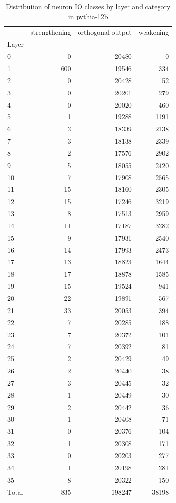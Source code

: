 \begin{table}
\caption{Distribution of neuron IO classes by layer and category in pythia-12b}
\label{tab:pythia-12b}
\begin{tabular}{lrrr}
 & strengthening & orthogonal output & weakening \\
Layer &  &  &  \\
0 & 0 & 20480 & 0 \\
1 & 600 & 19546 & 334 \\
2 & 0 & 20428 & 52 \\
3 & 0 & 20201 & 279 \\
4 & 0 & 20020 & 460 \\
5 & 1 & 19288 & 1191 \\
6 & 3 & 18339 & 2138 \\
7 & 3 & 18138 & 2339 \\
8 & 2 & 17576 & 2902 \\
9 & 5 & 18055 & 2420 \\
10 & 7 & 17908 & 2565 \\
11 & 15 & 18160 & 2305 \\
12 & 15 & 17246 & 3219 \\
13 & 8 & 17513 & 2959 \\
14 & 11 & 17187 & 3282 \\
15 & 9 & 17931 & 2540 \\
16 & 14 & 17993 & 2473 \\
17 & 13 & 18823 & 1644 \\
18 & 17 & 18878 & 1585 \\
19 & 15 & 19524 & 941 \\
20 & 22 & 19891 & 567 \\
21 & 33 & 20053 & 394 \\
22 & 7 & 20285 & 188 \\
23 & 7 & 20372 & 101 \\
24 & 7 & 20392 & 81 \\
25 & 2 & 20429 & 49 \\
26 & 2 & 20440 & 38 \\
27 & 3 & 20445 & 32 \\
28 & 1 & 20449 & 30 \\
29 & 2 & 20442 & 36 \\
30 & 1 & 20408 & 71 \\
31 & 0 & 20376 & 104 \\
32 & 1 & 20308 & 171 \\
33 & 0 & 20203 & 277 \\
34 & 1 & 20198 & 281 \\
35 & 8 & 20322 & 150 \\
Total & 835 & 698247 & 38198 \\
\end{tabular}
\end{table}
